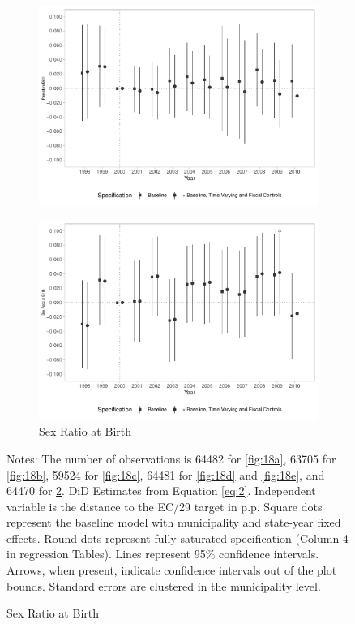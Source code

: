 \begin{figure}[h!]
\begin{center}
\begin{subfigure}{0.32\textwidth}
        \includegraphics[width=\textwidth]{plots/birth_premature_dist_ec29_baseline_dist_ec29_baseline_18.pdf}
    \end{subfigure}
    \begin{subfigure}{0.32\textwidth}
        \centering
        \caption{\scriptsize Sex Ratio at Birth}\label{fig:18f}
        \includegraphics[width=\textwidth]{plots/birth_sexratio_dist_ec29_baseline_dist_ec29_baseline_18.pdf}
    \end{subfigure}
    
    \end{center}
    
            \scriptsize{Notes: The number of observations is 64482 for \ref{fig:18a}, 63705 for \ref{fig:18b}, 59524 for \ref{fig:18c}, 64481 for \ref{fig:18d} and \ref{fig:18e}, and 64470 for \ref{fig:18f}. DiD Estimates from Equation \ref{eq:2}. Independent variable is the distance to the EC/29 target in p.p. Square dots represent the baseline model with municipality and state-year fixed effects. Round dots represent fully saturated specification (Column 4 in regression Tables). Lines represent 95\% confidence intervals. Arrows, when present, indicate confidence intervals out of the plot bounds. Standard errors are clustered in the municipality level.}
    
\end{figure}